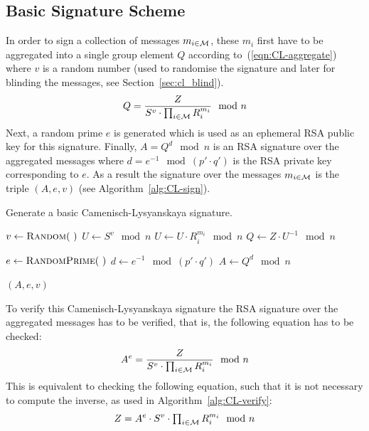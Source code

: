 \subsection{Basic Signature Scheme}\label{sec:cl_basic}

In order to sign a collection of messages $m_{i \in \mathcal{M}}$, these $m_i$ first
have to be aggregated into a single group element $Q$ according
to~(\ref{eqn:CL-aggregate}) where $v$ is a random number (used to randomise the
signature and later for blinding the messages, see Section~\ref{sec:cl_blind}).
\begin{equation}\label{eqn:CL-aggregate}
  Q = \dfrac{Z}{S^v \cdot \prod_{i \in \mathcal{M}} R_i^{m_i}} \mod n
\end{equation}
Next, a random prime $e$ is generated which is used as an ephemeral RSA public
key for this signature. Finally, $A = Q^d \mod n$ is an RSA signature over the
aggregated messages where $d = e^{-1} \mod (p' \cdot q')$ is the RSA private
key corresponding to $e$. As a result the signature over the messages
$m_{i \in \mathcal{M}}$ is the triple $(A, e, v)$ (see Algorithm~\ref{alg:CL-sign}).

\begin{algorithm}
  \caption{Generate a basic Camenisch-Lysyanskaya signature.}
  \label{alg:CL-sign}
  \addtolength{\baselineskip}{1mm}
  \begin{algorithmic}[1]
      \State $v \gets \Call{Random}{~}$
      \State $U \gets S^v \mod n$
        \State $U \gets U \cdot R_i^{m_i} \mod n$
      \EndFor
      \State $Q \gets Z \cdot U^{-1} \mod n$

      \State $e \gets \Call{RandomPrime}{~}$
      \State $d \gets e^{-1} \mod (p' \cdot q')$
      \State $A \gets Q^d \mod n$

      \Return $(A, e, v)$
    \EndFunction
  \end{algorithmic}
\end{algorithm}

To verify this Camenisch-Lysyanskaya signature the RSA signature over the
aggregated messages has to be verified, that is, the following equation has to
be checked:
\begin{equation}\label{eqn:CL-verify}
  A^e = \dfrac{Z}{S^v \cdot \prod_{i \in \mathcal{M}} R_i^{m_i}} \mod n
\end{equation}
This is equivalent to checking the following equation, such that it is not
necessary to compute the inverse, as used in Algorithm~\ref{alg:CL-verify}:
\begin{equation}\label{eqn:CL-verify-Z}
  Z = A^e \cdot S^v \cdot \textstyle\prod_{i \in \mathcal{M}} R_i^{m_i} \mod n
\end{equation}


